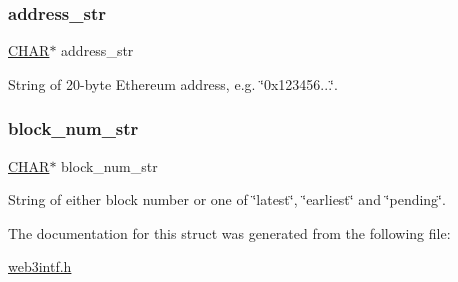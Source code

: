 \subsubsection{\texorpdfstring{address\+\_\+str}{address\_str}}
{\footnotesize\ttfamily \mbox{\hyperlink{boattypes_8h_aebb9e13210d88d43e32e735ada43a425}{C\+H\+AR}}$\ast$ address\+\_\+str}



String of 20-\/byte Ethereum address, e.\+g. \char`\"{}0x123456...\char`\"{}. 

\mbox{\label{struct_t_param__eth__get_transaction_count_af78d86478ad38ef1fecad6bfb059bd27}} 
\subsubsection{\texorpdfstring{block\+\_\+num\+\_\+str}{block\_num\_str}}
{\footnotesize\ttfamily \mbox{\hyperlink{boattypes_8h_aebb9e13210d88d43e32e735ada43a425}{C\+H\+AR}}$\ast$ block\+\_\+num\+\_\+str}



String of either block number or one of \char`\"{}latest\char`\"{}, \char`\"{}earliest\char`\"{} and \char`\"{}pending\char`\"{}. 



The documentation for this struct was generated from the following file\+:\begin{DoxyCompactItemize}
\item 
\mbox{\hyperlink{web3intf_8h}{web3intf.\+h}}\end{DoxyCompactItemize}
